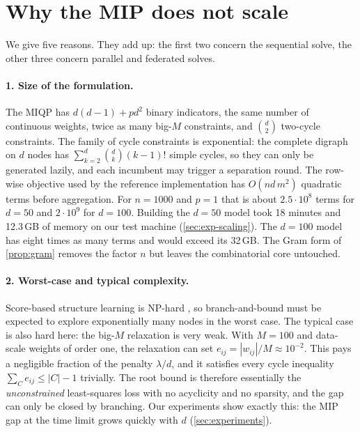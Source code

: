 \section{Why the MIP does not scale}
\label{sec:mip}

We give five reasons. They add up: the first two concern the sequential solve, the other three
concern parallel and federated solves.

\paragraph{1. Size of the formulation.}
The \exdbn{} MIQP has $d(d-1)+pd^2$ binary indicators, the same number of continuous
weights, twice as many big-$M$ constraints, and $\binom d2$ two-cycle constraints. The family
of cycle constraints is exponential: the complete digraph on $d$ nodes has
$\sum_{k=2}^{d}\binom dk (k-1)!$ simple cycles, so they can only be generated lazily, and each
incumbent may trigger a separation round. The row-wise objective used by the reference
implementation has $O(nd\,m^2)$ quadratic terms before aggregation. For $n=1000$ and $p=1$ that is
about $2.5\cdot 10^8$ terms for $d=50$ and $2\cdot 10^9$ for $d=100$. Building the $d=50$ model took
18 minutes and 12.3\,GB of memory on our test machine (\cref{sec:exp-scaling}). The $d=100$
model has eight times as many terms and would exceed its 32\,GB. The Gram form of \cref{prop:gram} removes the factor $n$ but leaves the
combinatorial core untouched.

\paragraph{2. Worst-case and typical complexity.}
Score-based structure learning is NP-hard \citep{chickering2004large}, so branch-and-bound
must be expected to explore exponentially many nodes in the worst case. The typical case is
also hard here: the big-$M$ relaxation is very weak. With $M=100$ and data-scale weights of
order one, the relaxation can set $e_{ij}=|w_{ij}|/M\approx 10^{-2}$. This pays a negligible
fraction of the penalty $\lambda/d$, and it satisfies every cycle inequality
$\sum_{C}e_{ij}\le|C|-1$ trivially. The root bound is therefore essentially the
\emph{unconstrained} least-squares loss with no acyclicity and no sparsity, and the gap can
only be closed by branching. Our experiments show exactly this: the MIP gap at the time limit
grows quickly with $d$ (\cref{sec:experiments}).

